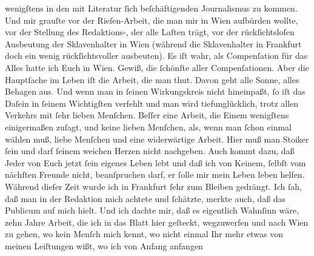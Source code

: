 \begin{ledgroupsized}[t]{13cm}
               wenigſtens in den mit Literatur ſich beſchäftigenden Journalismus zu kommen. Und mir
               grauſte vor der Rieſen-Arbeit, die man mir in Wien
               aufbürden wollte, vor der Stellung des Redaktions-\label{K_L02868-4v}\label{K_L02868-4h}, der alle Laſten
               trägt, vor der rückſichtsloſen Ausbeutung der Sklavenhalter in Wien (während die Sklavenhalter in Frankfurt doch ein wenig  rückſichtsvoller ausbeuten). Es iſt wahr, als Compenſation für das Alles hatte
               ich Euch in Wien.  Gewiß, die ſchönſte aller Compenſationen. Aber  die Hauptſache im Leben iſt die Arbeit, die man thut. Davon geht alle
               Sonne, alles Behagen aus. Und wenn man in ſeinen Wirkungskreis nicht hineinpaßt, ſo
               iſt das Daſein in ſeinem Wichtigſten verfehlt und man wird tiefunglücklich, trotz
               allen Verkehrs {\pb}mit ſehr lieben Menſchen. Beſſer
               eine Arbeit, die Einem wenigſtens einigermaßen zuſagt, und keine lieben Menſchen,
               als, wenn man ſchon einmal wählen muß, liebe Menſchen und eine widerwärtige Arbeit.
                  \introOben{}Hier muß man Stoiker ſein und darf ſeinem weichen Herzen nicht
                  nachgeben.\introOben{} Auch kommt dazu, daß Jeder von Euch jetzt ſein eigenes Leben lebt
               und daß ich von \strikeout{\textcolor{gray}{K}} Keinem, ſelbſt vom nächſten Freunde nicht, beanſpruchen darf, er ſolle mir
               mein Leben leben helfen. Während dieſer Zeit wurde ich in Frankfurt ſehr zum Bleiben gedrängt. Ich ſah, daß  man in der Redaktion mich achtete und ſchätzte, merkte auch, daß das
               Publicum auf mich hielt. Und ich dachte mir, daß es eigentlich Wahnſinn wäre, zehn
               Jahre Arbeit, die ich in das Blatt hier geſteckt, wegzuwerfen\strikeout{,} und nach
                  Wien zu gehen, wo kein Menſch mich kennt, wo
               nicht einmal Ihr mehr etwas von meinen Leiſtungen wißt, wo ich von Anfang anfangen

\end{ledgroupsized}
